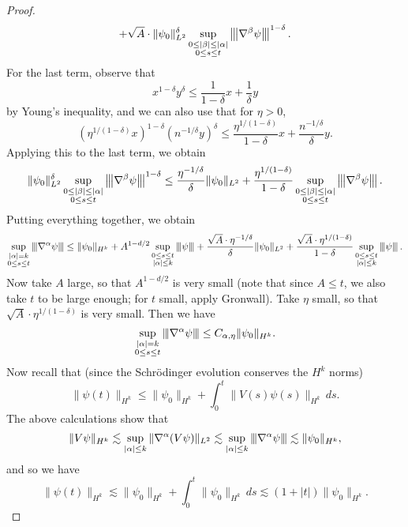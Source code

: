 \begin{proof}
\[    + \sqrt{A} \cdot \|\psi_0\|_{L^2}^\delta \sup_{\substack{0 \le |\beta| \le |\alpha| \\ 0 \le s \le t}} \left\lvert\hspace{-1 pt}\left\lvert\hspace{-1 pt}\left\lvert {\nabla^\beta \psi}\right\lvert\hspace{-1 pt}\right\lvert\hspace{-1 pt}\right\lvert^{1 - \delta}.
  \]
  For the last term, observe that
  \[
    x^{1 - \delta} y^\delta \le \frac{1}{1 - \delta} x + \frac{1}{\delta} y
  \]
  by Young's inequality, and we can also use that
  for $\eta > 0$,
  \[
  \left(\eta^{1 / (1 - \delta)} x\right)^{1 - \delta}
  \left(n^{-1 / \delta} y\right)^\delta
  \le \frac{\eta^{1 / (1 - \delta)}}{1 - \delta} x + 
  \frac{n^{-1 / \delta}}{\delta} y.
  \]
  Applying this to the last term, we obtain
  \[
    \|\psi_0\|_{L^2}^\delta \sup_{\substack{0 \le |\beta| \le |\alpha| \\ 0 \le s \le t}} \left\lvert\hspace{-1 pt}\left\lvert\hspace{-1 pt}\left\lvert {\nabla^\beta \psi}\right\lvert\hspace{-1 pt}\right\lvert\hspace{-1 pt}\right\lvert^{1 - \delta}
    \le \frac{\eta^{-1 / \delta}}{\delta} \|\psi_0\|_{L^2}
    + \frac{\eta^{1 / (1 - \delta)}}{1 - \delta}
    \sup_{\substack{0 \le |\beta| \le |\alpha| \\ 0 \le s \le t}} \left\lvert\hspace{-1 pt}\left\lvert\hspace{-1 pt}\left\lvert {\nabla^\beta \psi}\right\lvert\hspace{-1 pt}\right\lvert\hspace{-1 pt}\right\lvert.
  \]
  Putting everything together, we obtain
  \[
    \sup_{\substack{|\alpha| = k \\ 0 \le s \le t}}
    \left\lvert\hspace{-1 pt}\left\lvert\hspace{-1 pt}\left\lvert {\nabla^\alpha \psi}\right\lvert\hspace{-1 pt}\right\lvert\hspace{-1 pt}\right\lvert
    \le \|\psi_0\|_{H^k} + A^{1 - d / 2} \sup_{\substack{0 \le s \le t \\ |\alpha| \le k}} \left\lvert\hspace{-1 pt}\left\lvert\hspace{-1 pt}\left\lvert {\psi}\right\lvert\hspace{-1 pt}\right\lvert\hspace{-1 pt}\right\lvert
    + \frac{\sqrt{A} \cdot \eta^{-1 / \delta}}{\delta} \|\psi_0\|_{L^2}
    + \frac{\sqrt{A} \cdot \eta^{1 / (1 - \delta)}}{1 - \delta} \sup_{\substack{0 \le s \le t \\ |\alpha| \le k}} \left\lvert\hspace{-1 pt}\left\lvert\hspace{-1 pt}\left\lvert {\psi}\right\lvert\hspace{-1 pt}\right\lvert\hspace{-1 pt}\right\lvert.
  \]
  Now take $A$ large, so that $A^{1 - d / 2}$ is very
  small (note that since $A \le t$, we also take
  $t$ to be large enough; for $t$ small,
  apply Gronwall). Take $\eta$ small, so that $\sqrt{A} \cdot \eta^{1 / (1 - \delta)}$
  is very small. Then we have
  \[
    \sup_{\substack{|\alpha| = k \\ 0 \le s \le t}}
    \left\lvert\hspace{-1 pt}\left\lvert\hspace{-1 pt}\left\lvert {\nabla^\alpha \psi}\right\lvert\hspace{-1 pt}\right\lvert\hspace{-1 pt}\right\lvert
    \le C_{\alpha, \eta} \|\psi_0\|_{H^k}.
  \]
  Now recall that (since the Schr\"odinger evolution
  conserves the $H^k$ norms)
  \[
    \|\psi(t)\|_{H^k}
    \le \|\psi_0\|_{H^k} + \int_0^t \|V(s) \psi(s)\|_{H^k}\, ds.
  \]
  The above calculations show that
  \[
    \|V\psi\|_{H^k} \lesssim
    \sup_{|\alpha| \le k} \|\nabla^\alpha (V\psi)\|_{L^2}
    \lesssim \sup_{|\alpha| \le k} \left\lvert\hspace{-1 pt}\left\lvert\hspace{-1 pt}\left\lvert {\nabla^\alpha \psi}\right\lvert\hspace{-1 pt}\right\lvert\hspace{-1 pt}\right\lvert
    \lesssim \|\psi_0\|_{H^k},
  \]
  and so we have
  \[
    \|\psi(t)\|_{H^k}
    \lesssim \|\psi_0\|_{H^k} + \int_0^t \|\psi_0 \|_{H^k}\, ds
    \lesssim (1 + |t|) \|\psi_0\|_{H^k}.
\]
\end{proof}
